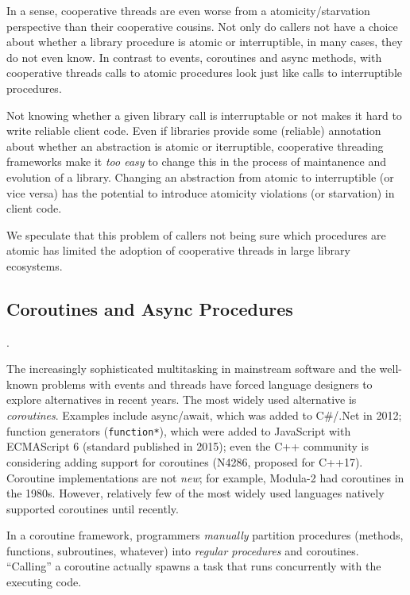 \documentclass[9pt,preprint]{sigplanconf}
\begin{document}
In a sense, cooperative threads are even worse from a atomicity/starvation perspective than their cooperative cousins.
Not only do callers not have a choice about whether a library procedure is atomic or interruptible, in many cases, they do not even know.
In contrast to events, coroutines and async methods, with cooperative threads calls to atomic procedures look just like calls to interruptible procedures.

Not knowing whether a given library call is interruptable or not makes it hard to write reliable client code.
Even if libraries provide some (reliable) annotation about whether an abstraction is atomic or iterruptible, cooperative threading frameworks make it \emph{too easy} to change this in the process of maintanence and evolution of a library.
Changing an abstraction from atomic to interruptible (or vice versa) has the potential to introduce atomicity violations (or starvation) in client code.

We speculate that this problem of callers not being sure which procedures are atomic has limited the adoption of cooperative threads in large library ecosystems.

\subsection{Coroutines and Async Procedures}.

The increasingly sophisticated multitasking in mainstream software and the well-known problems with events and threads have forced language designers to explore alternatives in recent years.
The most widely used alternative is \emph{coroutines}\footnotemark{}.
Examples include async/await, which was added to C\#/.Net in 2012; function generators (\texttt{function*}), which were added to JavaScript with ECMAScript 6 (standard published in 2015); even the C++ community is considering adding support for coroutines (N4286, proposed for C++17).
Coroutine implementations are not \emph{new}; for example, Modula-2 had coroutines in the 1980s.
However, relatively few of the most widely used languages natively supported coroutines until recently.


In a coroutine framework, programmers \emph{manually} partition procedures (methods, functions, subroutines, whatever) into \emph{regular procedures} and coroutines.
``Calling'' a coroutine actually spawns a task that runs concurrently with the executing code.
\end{document}
